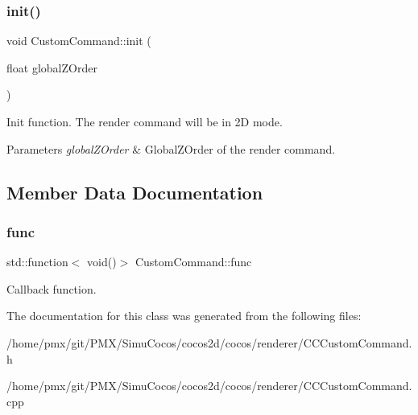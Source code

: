 \subsubsection{\texorpdfstring{init()}{init()}\hspace{0.1cm}{\footnotesize\ttfamily [4/4]}}
{\footnotesize\ttfamily void Custom\+Command\+::init (\begin{DoxyParamCaption}\item[{float}]{global\+Z\+Order }\end{DoxyParamCaption})}

Init function. The render command will be in 2D mode. 
\begin{DoxyParams}{Parameters}
{\em global\+Z\+Order} & Global\+Z\+Order of the render command. \\
\hline
\end{DoxyParams}


\subsection{Member Data Documentation}
\mbox{\label{classCustomCommand_aeb108aa0988bda558eec38f36f409114}} 
\subsubsection{\texorpdfstring{func}{func}}
{\footnotesize\ttfamily std\+::function$<$ void()$>$ Custom\+Command\+::func}

Callback function. 

The documentation for this class was generated from the following files\+:\begin{DoxyCompactItemize}
\item 
/home/pmx/git/\+P\+M\+X/\+Simu\+Cocos/cocos2d/cocos/renderer/C\+C\+Custom\+Command.\+h\item 
/home/pmx/git/\+P\+M\+X/\+Simu\+Cocos/cocos2d/cocos/renderer/C\+C\+Custom\+Command.\+cpp\end{DoxyCompactItemize}
